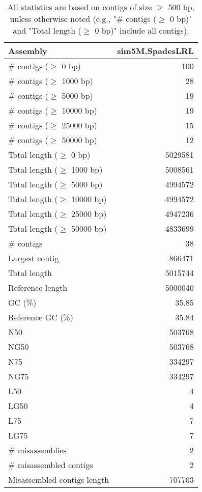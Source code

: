 \documentclass[12pt,a4paper]{article}
\begin{document}
\begin{table}[ht]
\begin{center}
\caption{All statistics are based on contigs of size $\geq$ 500 bp, unless otherwise noted (e.g., "\# contigs ($\geq$ 0 bp)" and "Total length ($\geq$ 0 bp)" include all contigs).}
\begin{tabular}{|l*{1}{|r}|}
\hline
Assembly & sim5M.SpadesLRL \\ \hline
\# contigs ($\geq$ 0 bp) & 100 \\ \hline
\# contigs ($\geq$ 1000 bp) & 28 \\ \hline
\# contigs ($\geq$ 5000 bp) & 19 \\ \hline
\# contigs ($\geq$ 10000 bp) & 19 \\ \hline
\# contigs ($\geq$ 25000 bp) & 15 \\ \hline
\# contigs ($\geq$ 50000 bp) & 12 \\ \hline
Total length ($\geq$ 0 bp) & 5029581 \\ \hline
Total length ($\geq$ 1000 bp) & 5008561 \\ \hline
Total length ($\geq$ 5000 bp) & 4994572 \\ \hline
Total length ($\geq$ 10000 bp) & 4994572 \\ \hline
Total length ($\geq$ 25000 bp) & 4947236 \\ \hline
Total length ($\geq$ 50000 bp) & 4833699 \\ \hline
\# contigs & 38 \\ \hline
Largest contig & 866471 \\ \hline
Total length & 5015744 \\ \hline
Reference length & 5000040 \\ \hline
GC (\%) & 35.85 \\ \hline
Reference GC (\%) & 35.84 \\ \hline
N50 & 503768 \\ \hline
NG50 & 503768 \\ \hline
N75 & 334297 \\ \hline
NG75 & 334297 \\ \hline
L50 & 4 \\ \hline
LG50 & 4 \\ \hline
L75 & 7 \\ \hline
LG75 & 7 \\ \hline
\# misassemblies & 2 \\ \hline
\# misassembled contigs & 2 \\ \hline
Misassembled contigs length & 707703 \\ \hline

\end{tabular}
\end{center}
\end{table}
\end{document}

